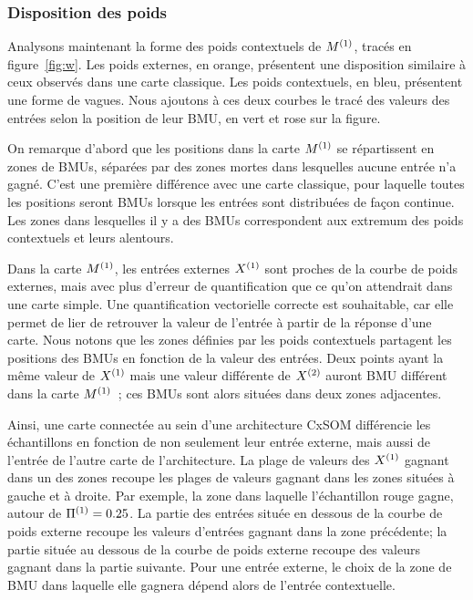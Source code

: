 \documentclass[../main]{subfiles}
\begin{document}
\subsubsection{Disposition des poids}

Analysons maintenant la forme des poids contextuels de $M^{({1})}$, tracés en figure~\ref{fig:w}.
Les poids externes, en orange, présentent une disposition similaire à ceux observés dans une carte classique. Les poids contextuels, en bleu, présentent une forme de vagues. Nous ajoutons à ces deux courbes le tracé des valeurs des entrées selon la position de leur BMU, en vert et rose sur la figure.

On remarque d'abord que les positions dans la carte $M^{({1})}$ se répartissent en zones de BMUs, séparées par des zones mortes dans lesquelles aucune entrée n'a gagné. 
C'est une première différence avec une carte classique, pour laquelle toutes les positions seront BMUs lorsque les entrées sont distribuées de façon continue.
Les zones dans lesquelles il y a des BMUs correspondent aux extremum des poids contextuels et leurs alentours.

Dans la carte $M^{({1})}$, les entrées externes $X^{({1})}$ sont proches de la courbe de poids externes, mais avec plus d'erreur de quantification que ce qu'on attendrait dans une carte simple. Une quantification vectorielle correcte est souhaitable, car elle permet de lier de retrouver la valeur de l'entrée à partir de la réponse d'une carte.
Nous notons que les zones définies par les poids contextuels partagent les positions des BMUs en fonction de la valeur des entrées. 
Deux points ayant la même valeur de $X^{({1})}$ mais une valeur différente de $X^{({2})}$ auront BMU différent dans la carte $M^{({1})}$~; ces BMUs sont alors situées dans deux zones adjacentes.

Ainsi, une carte connectée au sein d'une architecture CxSOM différencie les échantillons en fonction de non seulement leur entrée externe, mais aussi de l'entrée de l'autre carte de l'architecture. La plage de valeurs des $X^{({1})}$ gagnant dans un des zones recoupe les plages de valeurs gagnant dans les zones situées à gauche et à droite. Par exemple, la zone dans laquelle l'échantillon rouge gagne, autour de $\Pi^{({1})} = 0.25$. La partie des entrées située en dessous de la courbe de poids externe recoupe les valeurs d'entrées gagnant dans la zone précédente; la partie située au dessous de la courbe de poids externe recoupe des valeurs gagnant dans la partie suivante. Pour une entrée externe, le choix de la zone de BMU dans laquelle elle gagnera dépend alors de l'entrée contextuelle. 
\end{document}
